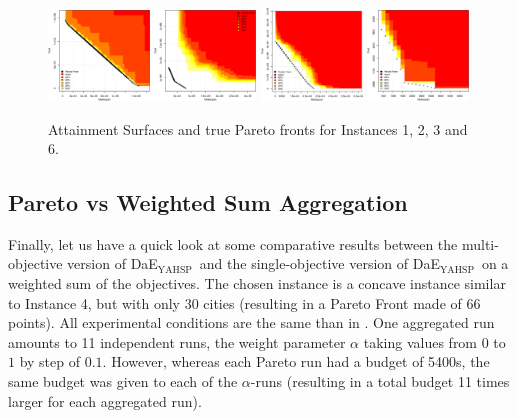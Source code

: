 \documentclass{llncs}
\newcommand{\DAEYAHSP}{{\sc DaE$_{\text{YAHSP}}$}}
\begin{document}
\begin{figure}[tb]
  \centering
      \includegraphics[width=0.24\textwidth]{large_1_att_area}
      \includegraphics[width=0.24\textwidth]{large_4_att_area}
      \includegraphics[width=0.24\textwidth]{large_9_att_area}
      \includegraphics[width=0.24\textwidth]{large_7_att_area}
 \caption{\label{attainment1} Attainment Surfaces and true Pareto fronts for Instances 1, 2, 3 and 6.}
\end{figure}

\subsection{Pareto vs Weighted Sum Aggregation}

Finally, let us have a quick look at some comparative results between the multi-objective version of \DAEYAHSP\ and the single-objective version of \DAEYAHSP\ on a weighted sum of the objectives. 
The chosen instance is a concave instance similar to Instance 4, but with only 30 cities (resulting in a Pareto Front made of 66 points). 
All experimental conditions are the same than in \cite{khouadjia:hal-00820634}. 
One aggregated run amounts to 11 independent runs, the weight parameter $\alpha$ taking values from $0$ to $1$ by step of $0.1$. However, whereas each Pareto run had a budget of 5400s, the same budget was given to each of the $\alpha$-runs (resulting in a total budget 11 times larger for each aggregated run). 
\end{document}
